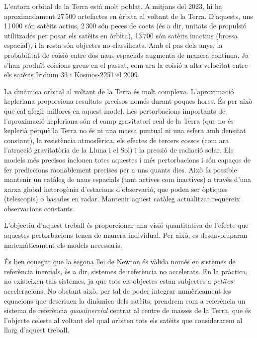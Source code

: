 \documentclass{article}
\begin{document}
L'entorn orbital de la Terra està molt poblat. A mitjans del 2023, hi ha aproximadament 27\,500 artefactes en òrbita al voltant de la Terra. D'aquests, uns 11\,000 són satè\lgem its actius, 2\,300 són peces de coets (és a dir, unitats de propulsió utilitzades per posar els satè\lgem its en òrbita), 13\,700 són satè\lgem its inactius (brossa espacial), i la resta són objectes no classificats. Amb el pas dels anys, la probabilitat de co\lgem isió entre dos naus espacials augmenta de manera contínua. Ja s'han produït co\lgem isions greus en el passat, com ara la co\lgem isió a alta velocitat entre els satè\lgem its Iridium 33 i Kosmos-2251 el 2009.

La dinàmica orbital al voltant de la Terra és molt complexa. L'aproximació kepleriana proporciona resultats precisos només durant poques hores. És per això que cal afegir millores en aquest model. Les pertorbacions importants de l'aproximació kepleriana són el camp gravitatori real de la Terra (que no és keplerià perquè la Terra no és ni una massa puntual ni una esfera amb densitat constant), la resistència atmosfèrica, els efectes de tercers cossos (com ara l'atracció gravitatòria de la Lluna i el Sol) i la pressió de radiació solar. Els models més precisos inclouen totes aquestes i més pertorbacions i són capaços de fer prediccions raonablement precises per a uns quants dies. Això fa possible mantenir un catàleg de naus espacials (tant actives com inactives) a través d'una xarxa global heterogènia d'estacions d'observació, que poden ser òptiques (telescopis) o basades en radar. Mantenir aquest catàleg actualitzat requereix observacions constants.

L'objectiu d'aquest treball és proporcionar una visió quantitativa de l'efecte que aquestes pertorbacions tenen de manera individual. Per això, es desenvoluparan matemàticament els models necessaris.

És ben conegut que la segona llei de Newton és vàlida només en sistemes de referència inercials, és a dir, sistemes de referència no accelerats. En la pràctica, no existeixen tals sistemes, ja que tots els objectes estan subjectes a \emph{petites} acceleracions. No obstant això, per tal de poder integrar numèricament les equacions que descriuen la dinàmica dels satè\lgem its, prendrem com a referència un sistema de referència \emph{quasiinercial} centrat al centre de masses de la Terra, que és l'objecte celeste al voltant del qual orbiten tots els satè\lgem its que considerarem al llarg d'aquest treball.
\end{document}
